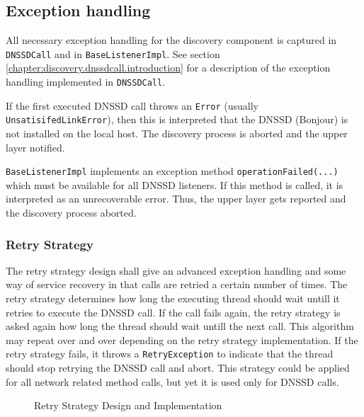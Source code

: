 \subsection{Exception handling}
All necessary exception handling for the discovery component is captured in \texttt{DNSSDCall} and in \texttt{BaseListenerImpl}. See section \ref{chapter:discovery.dnssdcall.introduction} for a description of the exception handling implemented in \texttt{DNSSDCall}.

If the first executed DNSSD call throws an \texttt{Error} (usually \texttt{UnsatisifedLinkError}), then this is interpreted that the DNSSD (Bonjour) is not installed on the local host. The discovery process is aborted and the upper layer notified.

\texttt{BaseListenerImpl} implements an exception method \texttt{operationFailed(...)} which must be available for all DNSSD listeners. If this method is called, it is interpreted as an unrecoverable error. Thus, the upper layer gets reported and the discovery process aborted.

\subsubsection{Retry Strategy}
The retry strategy design shall give an advanced exception handling and some way of service recovery in that calls are retried a certain number of times. The retry strategy determines how long the executing thread should wait untill it retries to execute the DNSSD call. If the call fails again, the retry strategy is asked again how long the thread should wait untill the next call. This algorithm may repeat over and over depending on the retry strategy implementation. If the retry strategy fails, it throws a \texttt{RetryException} to indicate that the thread should stop retrying the DNSSD call and abort. This strategy could be applied for all network related method calls, but yet it is used only for DNSSD calls. 

\begin{figure}[H]
 \centering
 \caption{Retry Strategy Design and Implementation}
 \label{fig:network.discovery.retrystrategy}
\end{figure}

